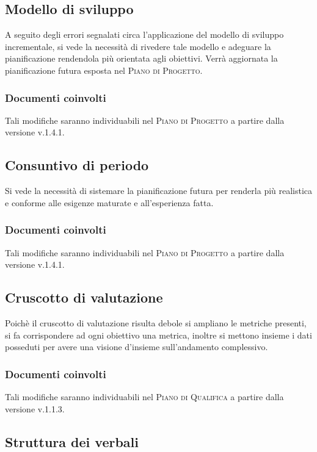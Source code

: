 \documentclass{article}
\begin{document}
\subsection{Modello di sviluppo}
\label{itm:2}

A seguito degli errori segnalati circa l'applicazione del modello di sviluppo incrementale, si vede la necessità di rivedere tale modello e adeguare la pianificazione rendendola
più orientata agli obiettivi. Verrà aggiornata la pianificazione futura esposta nel \textsc{Piano di Progetto}.
\subsubsection*{Documenti coinvolti}
Tali modifiche saranno individuabili nel \textsc{Piano di Progetto} a partire dalla versione v.1.4.1.

\subsection{Consuntivo di periodo}
\label{itm:3}

Si vede la necessità di sistemare la pianificazione futura per renderla più realistica e conforme alle esigenze maturate e all’esperienza fatta.
\subsubsection*{Documenti coinvolti}
Tali modifiche saranno individuabili nel \textsc{Piano di Progetto} a partire dalla versione v.1.4.1.

\subsection{Cruscotto di valutazione}
\label{itm:4}

Poichè il cruscotto di valutazione risulta debole si ampliano le metriche presenti, si fa corrispondere ad ogni obiettivo una metrica, inoltre
si mettono insieme i dati posseduti per avere una visione d’insieme sull’andamento complessivo.
\subsubsection*{Documenti coinvolti}
Tali modifiche saranno individuabili nel \textsc{Piano di Qualifica} a partire dalla versione v.1.1.3.

\subsection{Struttura dei verbali}
\label{itm:5}
\end{document}
